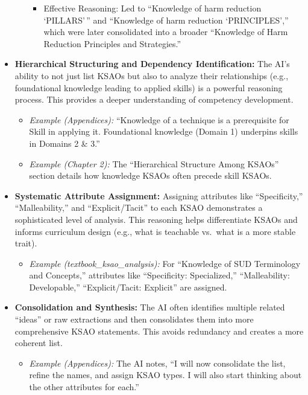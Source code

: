 \documentclass[
  letterpaper,
  DIV=11,
  numbers=noendperiod]{scrartcl}
\providecommand{\tightlist}{%
  \setlength{\itemsep}{0pt}\setlength{\parskip}{0pt}}
\begin{document}
\begin{itemize}
\begin{itemize}
    \begin{itemize}
    \tightlist
    \item
      Effective Reasoning: Led to ``Knowledge of harm reduction
      `PILLARS'\,'' and ``Knowledge of harm reduction `PRINCIPLES',''
      which were later consolidated into a broader ``Knowledge of Harm
      Reduction Principles and Strategies.''
    \end{itemize}
  \end{itemize}
\item
  \textbf{Hierarchical Structuring and Dependency Identification:} The
  AI's ability to not just list KSAOs but also to analyze their
  relationships (e.g., foundational knowledge leading to applied skills)
  is a powerful reasoning process. This provides a deeper understanding
  of competency development.

  \begin{itemize}
  \tightlist
  \item
    \emph{Example (Appendices):} ``Knowledge of a technique is a
    prerequisite for Skill in applying it. Foundational knowledge
    (Domain 1) underpins skills in Domains 2 \& 3.''
  \item
    \emph{Example (Chapter 2):} The ``Hierarchical Structure Among
    KSAOs'' section details how knowledge KSAOs often precede skill
    KSAOs.
  \end{itemize}
\item
  \textbf{Systematic Attribute Assignment:} Assigning attributes like
  ``Specificity,'' ``Malleability,'' and ``Explicit/Tacit'' to each KSAO
  demonstrates a sophisticated level of analysis. This reasoning helps
  differentiate KSAOs and informs curriculum design (e.g., what is
  teachable vs.~what is a more stable trait).

  \begin{itemize}
  \tightlist
  \item
    \emph{Example (textbook\_ksao\_analysis):} For ``Knowledge of SUD
    Terminology and Concepts,'' attributes like ``Specificity:
    Specialized,'' ``Malleability: Developable,'' ``Explicit/Tacit:
    Explicit'' are assigned.
  \end{itemize}
\item
  \textbf{Consolidation and Synthesis:} The AI often identifies multiple
  related ``ideas'' or raw extractions and then consolidates them into
  more comprehensive KSAO statements. This avoids redundancy and creates
  a more coherent list.

  \begin{itemize}
  \tightlist
  \item
    \emph{Example (Appendices):} The AI notes, ``I will now consolidate
    the list, refine the names, and assign KSAO types. I will also start
    thinking about the other attributes for each.''
  \end{itemize}
\end{itemize}
\end{document}
